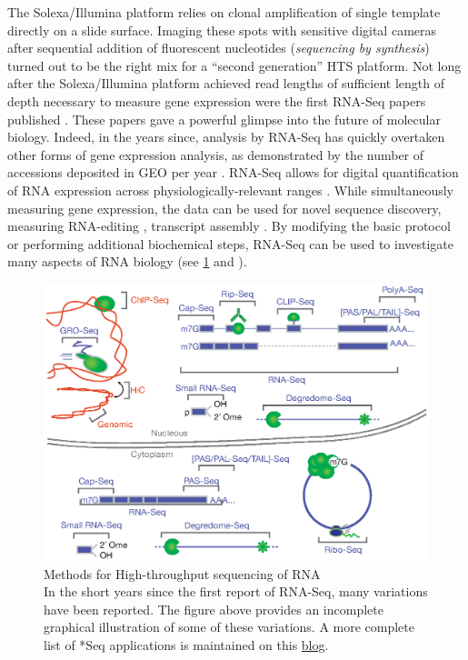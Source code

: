 The Solexa/Illumina platform relies on clonal amplification of single template directly on a slide surface. Imaging these spots with sensitive digital cameras after sequential addition of fluorescent nucleotides (\textit{sequencing by synthesis}) turned out to be the right mix for a ``second generation'' HTS platform. Not long after the Solexa/Illumina platform achieved read lengths of sufficient length of depth necessary to measure gene expression were the first RNA-Seq papers published \citep{Mortazavi2008, Nagalakshmi2008,Lister2008}. These papers gave a powerful glimpse into the future of molecular biology. Indeed, in the years since, analysis by RNA-Seq has quickly overtaken other forms of gene expression analysis, as demonstrated by the number of accessions deposited in GEO per year \citep{Barrett2013}. RNA-Seq allows for digital quantification of RNA expression across physiologically-relevant ranges \citep{Blencowe2009}. While simultaneously measuring gene expression, the data can be used for novel sequence discovery, measuring RNA-editing \citep{Li2011}, transcript assembly \citep{Trapnell2010}. By modifying the basic protocol or performing additional biochemical steps, RNA-Seq can be used to investigate many aspects of RNA biology (see \ref{fig:htsMethods} and \citep{Mutz2013}). 

\begin{figure}[htbp]
	\centering 
	\includegraphics{Figures/Chapter1/RNA_Sequencing_methodologies.eps}
	\caption[Methods for High-throughput sequencing of RNA]
	{
		Methods for High-throughput sequencing of RNA\\[0.25cm]
		In the short years since the first report of RNA-Seq, many variations have been reported. The figure above provides an incomplete graphical illustration of some of these variations. A more complete list of *Seq applications is maintained on this \href{http://liorpachter.wordpress.com/seq/}{blog}.
	}
	\label{fig:htsMethods}
\end{figure}

